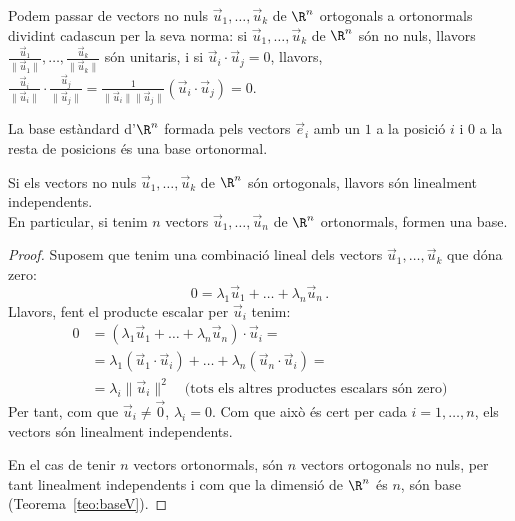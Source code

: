 \begin{observacio}
Podem passar de vectors no nuls $\vec u_1, \dots, \vec u_k$ de $\R^n$ ortogonals a ortonormals dividint cadascun per la seva norma: si $\vec u_1, \dots, \vec u_k$ de $\R^n$ són no nuls, llavors $\frac{\vec u_1}{\|\vec u_1\|}, \dots, \frac{\vec u_k}{\|\vec u_k\|}$ són unitaris, i si $\vec u_i\cdot \vec u_j=0$, llavors, $\frac{\vec u_i}{\|\vec u_i\|}\cdot \frac{\vec u_j}{\|\vec u_j\|}=\frac{1}{\|\vec u_i\| \|\vec u_j\|}(\vec u_i\cdot \vec u_j)=0$.
\end{observacio}
\begin{exemple}
La base estàndard d'$\R^n$ formada pels vectors $\vec e_i$ amb un $1$ a la posició $i$ i $0$ a la resta de posicions és una base ortonormal.
\end{exemple}
\begin{lema}
Si els vectors no nuls $\vec u_1, \dots, \vec u_k$ de $\R^n$ són ortogonals, llavors són linealment independents.\\
En particular, si tenim $n$ vectors $\vec u_1, \dots, \vec u_n$ de $\R^n$ ortonormals, formen una base.
\end{lema}
\begin{proof}
Suposem que tenim una combinació lineal dels vectors $\vec u_1, \dots, \vec u_k$ que dóna zero:
$$
0 = \lambda_1 \vec u_1 + \dots + \lambda_n\vec u_n \,.
$$
Llavors, fent el producte escalar per $\vec u_i$ tenim:
\begin{align*}
    0 &  = (\lambda_1 \vec u_1 + \dots + \lambda_n\vec u_n)\cdot \vec u_i= \\
     & = \lambda_1 (\vec u_1 \cdot \vec u_i) + \dots + \lambda_n(\vec u_n\cdot \vec u_i)=\\
     & = \lambda_i \|\vec u_i\|^2\quad \text{(tots els altres productes escalars són zero)}
\end{align*}
Per tant, com que $\vec u_i\neq\vec 0$, $\lambda_i=0$. Com que això és cert per cada $i=1,\ldots,n$, els vectors són linealment independents.

En el cas de tenir $n$ vectors ortonormals, són $n$ vectors ortogonals no nuls, per tant linealment independents i com que la dimensió de $\R^n$ és $n$, són base (Teorema~\ref{teo:baseV}).
\end{proof}


